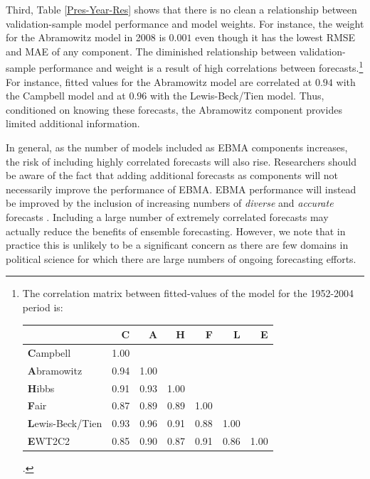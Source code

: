 \documentclass[12pt,fullpage,endnotes]{article}
\newcommand{\note}[1]{\footnote{ #1 \vspace{4 mm}}}
\begin{document}
 Third, Table \ref{Pres-Year-Res} shows that there is no clean a
 relationship between validation-sample model performance and model
 weights. For instance, the weight for the Abramowitz model in 2008 is
 $0.001$ even though it has the lowest RMSE and MAE of any component.
 The diminished relationship between validation-sample performance and
 weight is a result of high correlations between forecasts.\note{The
   correlation matrix between fitted-values of the
   model for the 1952-2004 period is: \\

\begin{tabular}{l  rrrrrr}
  \toprule
 & \textbf{C}& \textbf{A} & \textbf{H}& \textbf{F} & \textbf{L} & \textbf{E} \\ 
  \midrule
\textbf{C}ampbell& 1.00 &  &  &  &  & \\
\textbf{A}bramowitz & 0.94 & 1.00 &  &  &  & \\
\textbf{H}ibbs & 0.91 & 0.93 & 1.00&  &  & \\
\textbf{F}air & 0.87 & 0.89 & 0.89 & 1.00&  & \\
\textbf{L}ewis-Beck/Tien & 0.93 & 0.96 & 0.91 & 0.88 & 1.00 & \\
\textbf{E}WT2C2 & 0.85 & 0.90 & 0.87 & 0.91 & 0.86 & 1.00\\
   \bottomrule
 \end{tabular}.}
For instance, fitted values for the Abramowitz model are correlated at
$0.94$ with the Campbell model and at $0.96$ with the Lewis-Beck/Tien
model. Thus, conditioned on knowing these forecasts, the Abramowitz
component provides limited additional information.  

In general, as the number of models included as EBMA components
increases, the risk of including highly correlated forecasts will also
rise.  Researchers should be aware of the fact that adding additional
forecasts as components will not necessarily improve the performance
of EBMA.  EBMA performance will instead be improved by the inclusion
of increasing numbers of \textit{diverse} and \textit{accurate}
forecasts \citep[see also,][]{Graefe:2010}.  Including a large number
of extremely correlated forecasts may actually reduce the benefits of
ensemble forecasting.  However, we note that in practice this is
unlikely to be a significant concern as there are few domains in
political science for which there are large numbers of ongoing
forecasting efforts.
\end{document}
